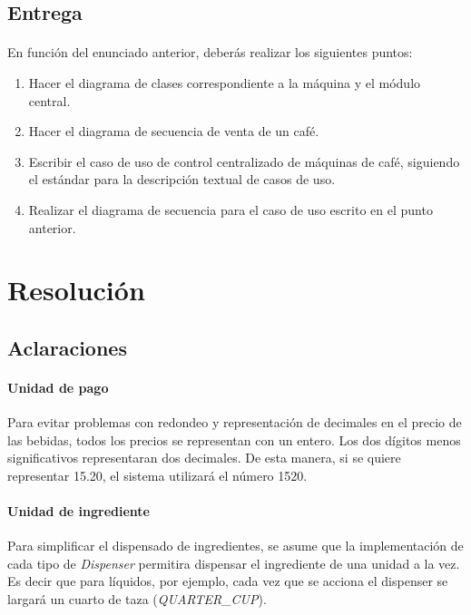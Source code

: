 \documentclass[a4paper,10pt]{extarticle}
\begin{document}
    \subsection{Entrega}
        \paragraph{}
        En función del enunciado anterior, deberás realizar los siguientes puntos:

        \begin{enumerate}
            \item Hacer el diagrama de clases correspondiente a la máquina y el módulo central. 
            \item Hacer el diagrama de secuencia de venta de un café.
            \item Escribir el caso de uso de control centralizado de máquinas de café, siguiendo el estándar para la descripción textual de casos de uso.
            \item Realizar el diagrama de secuencia para el caso de uso escrito en el punto anterior.
        \end{enumerate}
\pagebreak
\section{Resolución}
    \subsection{Aclaraciones}
        \paragraph{Unidad de pago}
        Para evitar problemas con redondeo y representación de decimales en el precio de las bebidas, todos los precios se representan con un entero. Los dos dígitos menos significativos representaran dos decimales. De esta manera, si se quiere representar 15.20, el sistema utilizará el número 1520.

        \paragraph{Unidad de ingrediente}
        Para simplificar el dispensado de ingredientes, se asume que la implementación de cada tipo de \textit{Dispenser} permitira dispensar el ingrediente de una unidad a la vez. Es decir que para líquidos, por ejemplo, cada vez que se acciona el dispenser se largará un cuarto de taza (\textit{QUARTER\_CUP}).
\end{document}

